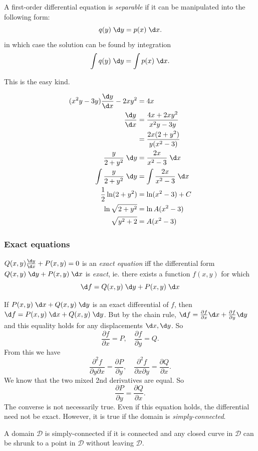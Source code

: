\documentclass[a4paper]{article}
\begin{document}
\begin{defi}
  A first-order differential equation is \emph{separable} if it can be manipulated into the following form:
  \[
    q(y) \;\d y = p(x) \;\d x.
  \]
  in which case the solution can be found by integration
  \[
    \int q(y)\;\d y = \int p(x)\; \d x.
  \]
\end{defi}
This is the easy kind.

\begin{eg}
  \begin{align*}
    (x^2y - 3y)\frac{\d y}{\d x} - 2xy^2 &= 4x\\
    \frac{\d y}{\d x} &= \frac{4x + 2xy^2}{x^2y - 3y}\\
    &= \frac{2x(2 + y^2)}{y(x^2 - 3)}\\
    \frac{y}{2 + y^2}\; \d y &= \frac{2x}{x^2 - 3}\;\d x\\
    \int \frac{y}{2 + y^2}\; \d y &= \int\frac{2x}{x^2 - 3}\;\d x\\
    \frac{1}{2}\ln(2 + y^2) &= \ln (x^2 - 3) + C\\
    \ln \sqrt{2 + y^2} &= \ln A(x^2 - 3)\\
    \sqrt{y^2 + 2} &= A(x^2 - 3)
  \end{align*}
\end{eg}
\subsubsection{Exact equations}
\begin{defi}
  $Q(x, y)\frac{\d y}{\d x} + P(x, y) = 0$ is an \emph{exact equation} iff the differential form $Q(x, y)\;\d y + P(x, y)\;\d x$ is \emph{exact}, ie. there exists a function $f(x, y)$ for which
  \[
    \d f = Q(x, y)\;\d y + P(x, y)\;\d x
  \]
\end{defi}

If $P(x, y)\;\d x + Q(x, y)\;\d y$ is an exact differential of $f$, then $\d f = P(x, y) \;\d x + Q(x, y)\;\d y$. But by the chain rule, $\d f = \frac{\partial f}{\partial x}\d x + \frac{\partial f}{\partial y}\d y$ and this equality holds for any displacements $\d x, \d y$. So
\[
  \frac{\partial f}{\partial x} = P,\quad\frac{\partial f}{\partial y} = Q.
\]
From this we have
\[
  \frac{\partial^2 f}{\partial y\partial x} = \frac{\partial P}{\partial y},\quad\frac{\partial^2 f}{\partial x \partial y} = \frac{\partial Q}{\partial x}.
\]
We know that the two mixed 2nd derivatives are equal. So
\[
  \frac{\partial P}{\partial y} = \frac{\partial Q}{\partial x}.
\]
The converse is not necessarily true. Even if this equation holds, the differential need not be exact. However, it is true if the domain is \emph{simply-connected}.
\begin{defi}
  A domain $\mathcal{D}$ is simply-connected if it is connected and any closed curve in $\mathcal{D}$ can be shrunk to a point in $\mathcal{D}$ without leaving $\mathcal{D}$.
\end{defi}
\end{document}
